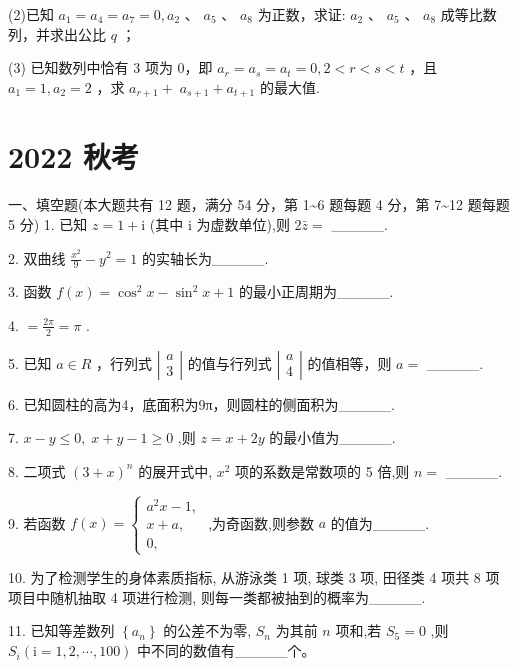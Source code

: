 \documentclass[10pt]{article}
\begin{document}
(2)已知 \({a}_{1} = {a}_{4} = {a}_{7} = 0,{a}_{2}\) 、 \({a}_{5}\) 、 \({a}_{8}\) 为正数，求证: \({a}_{2}\) 、 \({a}_{5}\) 、 \({a}_{8}\) 成等比数列，并求出公比 \(q\) ；

(3) 已知数列中恰有 3 项为 0，即 \({a}_{r} = {a}_{s} = {a}_{t} = 0,2 < r < s < t\) ，且 \({a}_{1} = 1,{a}_{2} = 2\) ，求 \({a}_{r + 1} + \; {a}_{s + 1} + {a}_{t + 1}\) 的最大值.

\section*{2022 秋考}

一、填空题(本大题共有 12 题，满分 54 分，第 1\textasciitilde 6 题每题 4 分，第 7\textasciitilde 12 题每题 5 分) 1. 已知 \(z = 1 + \mathrm{i}\) (其中 \(\mathrm{i}\) 为虚数单位),则 \(2\bar{z} =\) \_\_\_\_\_.

2. 双曲线 \(\frac{{x}^{2}}{9} - {y}^{2} = 1\) 的实轴长为\_\_\_\_\_.

3. 函数 \(f\left( x\right)  = {\cos }^{2}x - {\sin }^{2}x + 1\) 的最小正周期为\_\_\_\_\_.

4. \(= \frac{2\pi }{2} = \pi\) .

5. 已知 \(a \in  R\) ，行列式 \(\left| \begin{array}{l} a \\  3 \end{array}\right|\) 的值与行列式 \(\left| \begin{array}{l} a \\  4 \end{array}\right|\) 的值相等，则 \(a =\) \_\_\_\_\_.

6. 已知圆柱的高为4，底面积为9π，则圆柱的侧面积为\_\_\_\_\_.

7. \(x - y \leq  0,\;x + y - 1 \geq  0\) ,则 \(z = x + {2y}\) 的最小值为\_\_\_\_\_.

8. 二项式 \({\left( 3 + x\right) }^{n}\) 的展开式中, \({x}^{2}\) 项的系数是常数项的 5 倍,则 \(n =\) \_\_\_\_\_.

9. 若函数 \(f\left( x\right)  = \left\{  \begin{array}{l} {a}^{2}x - 1, \\  x + a, \\  0, \end{array}\right.\) ,为奇函数,则参数 \(a\) 的值为\_\_\_\_\_.

10. 为了检测学生的身体素质指标, 从游泳类 1 项, 球类 3 项, 田径类 4 项共 8 项项目中随机抽取 4 项进行检测, 则每一类都被抽到的概率为\_\_\_\_\_.

11. 已知等差数列 \(\left\{  {a}_{n}\right\}\) 的公差不为零, \({S}_{n}\) 为其前 \(n\) 项和,若 \({S}_{5} = 0\) ,则 \({S}_{i}\left( {\mathrm{i} = 1,2,\cdots ,{100}}\right)\) 中不同的数值有\_\_\_\_\_个。
\end{document}
